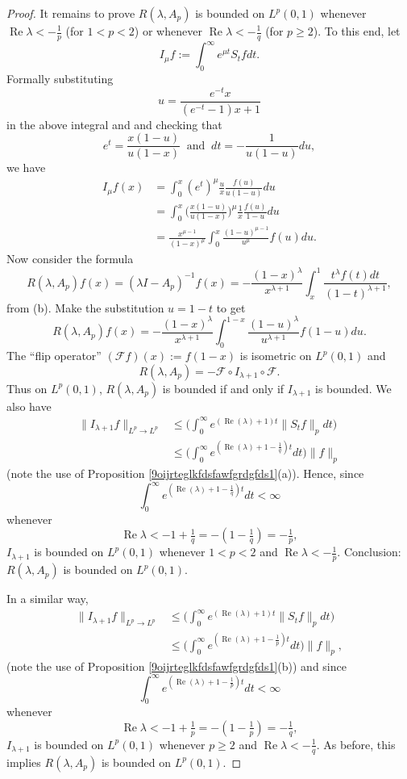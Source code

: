 \documentclass[11pt]{amsart}
\numberwithin{equation}{section}
\theoremstyle{plain}
\theoremstyle{definition}
\renewcommand{\leq}{\leqslant}
\renewcommand{\geq}{\geqslant}
\renewcommand{\Re}[1]{\operatorname{Re} #1 }
\newcommand{\0}{{\color{lightgray}0}}
\begin{document}
\begin{proof}
It remains to prove $R(\lambda,A_p)$ is bounded on $L^{p}(0,1)$ whenever $\Re \lambda <-\frac{1}{p}$ (for $1 < p < 2$) or whenever $\Re \lambda < -\frac{1}{q}$ (for $p \geq 2$). To this end, let 
$$I_{\mu} f:=\int_{0}^{\infty}e^{\mu t}S_{t}fdt.$$
Formally substituting 
$$u=\frac{e^{-t}x}{(e^{-t}-1)x+1}$$
in the above integral and 
and checking that 
$$e^{t} = \frac{x(1 - u)}{u (1 - x)} \;  \; \mbox{and} \; \; dt = - \frac{1}{u (1 - u)} du,$$
 we   have 
\begin{align*}
I_{\mu}f(x)& =\int_{0}^{x}(e^{t})^{\mu}\frac{u}{x}\frac{f(u)}{u(1-u)}du\\ & =\int_{0}^{x}\bigg(\frac{x(1-u)}{u(1-x)}\bigg)^{\mu}\frac{1}{x}\frac{f(u)}{1-u}du\\
&=\frac{x^{\mu-1}}{(1-x)^{\mu}}\int_{0}^{x}\frac{(1-u)^{\mu-1}}{u^{\mu}}f(u)du.
\end{align*}
Now consider the formula 
$$R(\lambda,A_p)f(x)=(\lambda I-A_p)^{-1}f(x)=-\frac{(1-x)^{\lambda}}{x^{\lambda+1}}\int_{x}^{1}\frac{t^{\lambda}f(t)dt}{(1-t)^{\lambda+1}},$$
from (b). 
Make the substitution $u=1-t$ to get 
$$R(\lambda,A_p)f(x)=-\frac{(1-x)^{\lambda}}{x^{\lambda+1}}\int_{0}^{1-x}\frac{(1-u)^{\lambda}}{u^{\lambda+1}}f(1-u)du.$$
The  ``flip operator''
$(\mathcal{F}f)(x):=f(1-x)$
is isometric on $L^p(0, 1)$ and 
$$R(\lambda,A_p)=-\mathcal{F}\circ I_{\lambda+1}\circ\mathcal{F}.$$
Thus  on $L^p(0, 1)$, $R(\lambda,A_p)$ is bounded if and only if  $I_{\lambda+1}$ is bounded. We also have 
\begin{align*}
\| I_{\lambda+1}f\|_{L^p \to L^p}  & \leq\bigg(\int_{0}^{\infty}e^{(\Re (\lambda)+1)t}\| S_{t}f\|_{p}dt\bigg)\\
 & \leq\bigg(\int_{0}^{\infty}e^{(\Re(\lambda)+1-\frac{1}{q})t}dt\bigg)  \|f\|_p
 \end{align*}
(note the use of Proposition \ref{9oijrteglkfdsfawfgrdgfds1}(a)). Hence, since  
$$\int_{0}^{\infty}e^{(\Re(\lambda)+1-\frac{1}{q})t}dt<\infty$$ whenever 
$$\Re \lambda <-1+\tfrac{1}{q}=-(1-\tfrac{1}{q})=-\tfrac{1}{p},$$ $I_{\lambda+1}$ is bounded on $L^{p}(0, 1)$ whenever $1 < p < 2$ and $\Re \lambda<-\frac{1}{p}$. Conclusion: $R(\lambda,A_p)$ is bounded on $L^{p}(0, 1)$. 


In a similar way, 
\begin{align*}
\| I_{\lambda+1}f\|_{L^p \to L^p}  & \leq\bigg(\int_{0}^{\infty}e^{(\Re (\lambda)+1)t}\| S_{t}f\|_{p}dt\bigg)\\
 & \leq\bigg(\int_{0}^{\infty}e^{(\Re(\lambda)+1-\frac{1}{p})t}dt\bigg)  \|f\|_p,
 \end{align*}
 (note the use of Proposition \ref{9oijrteglkfdsfawfgrdgfds1}(b)) 
 and since 
$$\int_{0}^{\infty}e^{(\Re(\lambda)+1-\frac{1}{p})t}dt<\infty$$ whenever 
$$\Re \lambda <-1+\tfrac{1}{p}=-(1-\tfrac{1}{p})=-\tfrac{1}{q},$$  $I_{\lambda+1}$ is bounded on $L^{p}(0, 1)$ whenever $p \geq 2$ and $\Re \lambda<-\frac{1}{q}$. As before, this implies $R(\lambda,A_p)$ is bounded on $L^{p}(0, 1)$. 
\end{proof}
\end{document}
